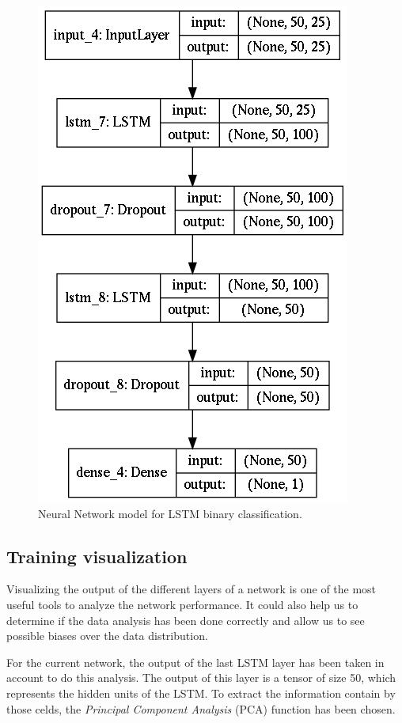 \begin{figure}[H]
\centering
\includegraphics[scale=0.5]{Figures/binary-lstm-model}
\decoRule
\caption[Neural Network model for LSTM binary classification]{Neural Network model for LSTM binary classification.}
\label{fig:binary-lstm-model}
\end{figure}

\subsection{Training visualization}

Visualizing the output of the different layers of a network is one of the most useful tools to analyze the network performance.
It could also help us to determine if the data analysis has been done correctly and allow us to see possible biases over the data distribution.

For the current network, the output of the last LSTM layer has been taken in account to do this analysis.
The output of this layer is a tensor of size 50, which represents the hidden units of the LSTM. To extract the information contain by those celds, the \textit{Principal Component Analysis} (PCA) function has been chosen.

